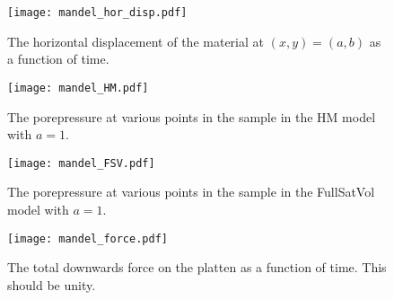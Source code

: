 \documentclass[]{scrreprt}
\begin{document}
\begin{figure}[htb]
\begin{center}
\texttt{[image: mandel\_hor\_disp.pdf]}
\caption{The horizontal displacement of the material at $(x,y) = (a,
  b)$ as a function of time.}
\label{mandel_hor_disp.fig}
\end{center}
\end{figure}


\begin{figure}[htb]
\begin{center}
\texttt{[image: mandel\_HM.pdf]}
\caption{The porepressure at various points in the sample in the HM
  model with $a=1$.}
\label{mandel_HM.fig}
\end{center}
\end{figure}


\begin{figure}[htb]
\begin{center}
\texttt{[image: mandel\_FSV.pdf]}
\caption{The porepressure at various points in the sample in the FullSatVol
  model with $a=1$.}
\label{mandel_FSV.fig}
\end{center}
\end{figure}

\begin{figure}[htb]
\begin{center}
\texttt{[image: mandel\_force.pdf]}
\caption{The total downwards force on the platten as a function of
  time.  This should be unity.}
\label{mandel_force.fig}
\end{center}
\end{figure}
\end{document}
